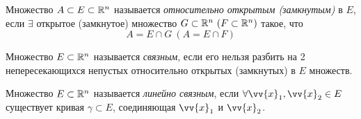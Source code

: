 \begin{definition}
	Множество $A \subset E \subset \mathbb{R}^n$ называется \textit{относительно открытым (замкнутым)} в $E$, если $\exists$ открытое (замкнутое) множество $G \subset \mathbb{R}^n\ (F \subset \mathbb{R}^n)$ такое, что
	\[
		A = E \cap G\ (A = E \cap F)
	\]
\end{definition}

\begin{definition}
	Множество $E \subset \mathbb{R}^n$ называется \textit{связным}, если его нельзя разбить на 2 непересекающихся непустых относительно открытых (замкнутых) в $E$ множеств.
\end{definition}

\begin{definition}
	Множество $E \subset \mathbb{R}^n$ называется \textit{линейно связным}, если $\forall \vv{x}_1, \vv{x}_2 \in E$ существует кривая $\gamma \subset E$, соединяющая $\vv{x}_1$ и $\vv{x}_2$.
\end{definition}